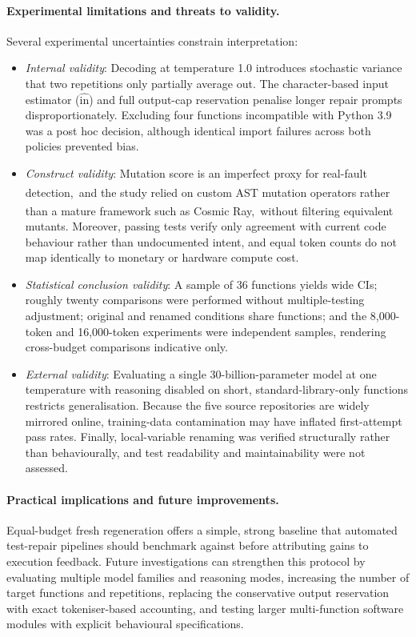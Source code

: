 \documentclass[11pt,a4paper]{article}
\newcommand{\ysjcite}[1]{\,\textsuperscript{\cite{#1}}}
\begin{document}
\paragraph{Experimental limitations and threats to validity.}
Several experimental uncertainties constrain interpretation:
\begin{itemize}[leftmargin=*,nosep]
  \item \emph{Internal validity}: Decoding at temperature 1.0 introduces stochastic variance that two repetitions only partially average out. The character-based input estimator ($\widehat{\text{in}}$) and full output-cap reservation penalise longer repair prompts disproportionately. Excluding four functions incompatible with Python 3.9 was a post hoc decision, although identical import failures across both policies prevented bias.
  \item \emph{Construct validity}: Mutation score is an imperfect proxy for real-fault detection,\ysjcite{just2014mutants,papadakis2018correlated} and the study relied on custom AST mutation operators rather than a mature framework such as Cosmic Ray,\ysjcite{cosmicray} without filtering equivalent mutants. Moreover, passing tests verify only agreement with current code behaviour rather than undocumented intent, and equal token counts do not map identically to monetary or hardware compute cost.
  \item \emph{Statistical conclusion validity}: A sample of 36 functions yields wide CIs; roughly twenty comparisons were performed without multiple-testing adjustment; original and renamed conditions share functions; and the 8{,}000-token and 16{,}000-token experiments were independent samples, rendering cross-budget comparisons indicative only.
  \item \emph{External validity}: Evaluating a single 30-billion-parameter model at one temperature with reasoning disabled on short, standard-library-only functions restricts generalisation. Because the five source repositories are widely mirrored online, training-data contamination may have inflated first-attempt pass rates. Finally, local-variable renaming was verified structurally rather than behaviourally, and test readability and maintainability were not assessed.
\end{itemize}

\paragraph{Practical implications and future improvements.}
Equal-budget fresh regeneration offers a simple, strong baseline that automated test-repair pipelines should benchmark against before attributing gains to execution feedback. Future investigations can strengthen this protocol by evaluating multiple model families and reasoning modes, increasing the number of target functions and repetitions, replacing the conservative output reservation with exact tokeniser-based accounting, and testing larger multi-function software modules with explicit behavioural specifications.
\end{document}
